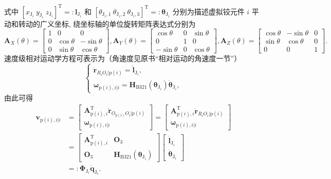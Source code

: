 式中 $[x_{\mathrm{J}_i}\ y_{\mathrm{J}_i}\ z_{\mathrm{J}_i}]^{\mathrm{T}} =: \boldsymbol{l}_{\mathrm{J}_i}$ 和 $[\theta_{\mathrm{J}_i,1}\ \theta_{\mathrm{J}_i,2}\ \theta_{\mathrm{J}_i,3}]^{\mathrm{T}} =: \boldsymbol{\theta}_{\mathrm{J}_i}$ 分别为描述虚拟铰元件 $i$ 平动和转动的广义坐标, 绕坐标轴的单位旋转矩阵表达式分别为
\[
\boldsymbol{A}_X(\theta) = \begin{bmatrix} 1 & 0 & 0 \\ 0 & \cos\theta & -\sin\theta \\ 0 & \sin\theta & \cos\theta \end{bmatrix},
\boldsymbol{A}_Y(\theta) = \begin{bmatrix} \cos\theta & 0 & \sin\theta \\ 0 & 1 & 0 \\ -\sin\theta & 0 & \cos\theta \end{bmatrix},
\boldsymbol{A}_Z(\theta) = \begin{bmatrix} \cos\theta & -\sin\theta & 0 \\ \sin\theta & \cos\theta & 0 \\ 0 & 0 & 1 \end{bmatrix}.
\]
速度级相对运动学方程可表示为（角速度见原书“相对运动的角速度一节”）
\[
\begin{cases}
\dot{\boldsymbol{r}}_{R_i O_i|\mathrm{p}(i)} = \dot{\boldsymbol{l}}_{\mathrm{J}_i},\\[6pt]
\boldsymbol{\omega}_{\mathrm{p}(i),i|i} = \boldsymbol{H}_{\mathrm{B321}}(\boldsymbol{\theta}_{\mathrm{J}_i}) \dot{\boldsymbol{\theta}}_{\mathrm{J}_i},
\end{cases}
\]
由此可得
\[
\begin{aligned}
\boldsymbol{v}_{\mathrm{p}(i),i|i} &= \begin{bmatrix} \boldsymbol{A}_{\mathrm{p}(i),i}^{\mathrm{T}} \dot{\boldsymbol{r}}_{O_{\mathrm{p}(i)} O_i|\mathrm{p}(i)} \\ \boldsymbol{\omega}_{\mathrm{p}(i),i|i} \end{bmatrix} = \begin{bmatrix} \boldsymbol{A}_{\mathrm{p}(i),i}^{\mathrm{T}} \dot{\boldsymbol{r}}_{R_i O_i|\mathrm{p}(i)} \\ \boldsymbol{\omega}_{\mathrm{p}(i),i|i} \end{bmatrix} \\
&= \begin{bmatrix} \boldsymbol{A}_{\mathrm{p}(i),i}^{\mathrm{T}} & \boldsymbol{O}_3 \\ \boldsymbol{O}_3 & \boldsymbol{H}_{\mathrm{B321}}(\boldsymbol{\theta}_{\mathrm{J}_i}) \end{bmatrix} \begin{bmatrix} \dot{\boldsymbol{l}}_{\mathrm{J}_i} \\ \dot{\boldsymbol{\theta}}_{\mathrm{J}_i} \end{bmatrix} \\
&=: \boldsymbol{\Phi}_{\mathrm{J}_i} \dot{\boldsymbol{q}}_{\mathrm{J}_i}.
\end{aligned}
\]
